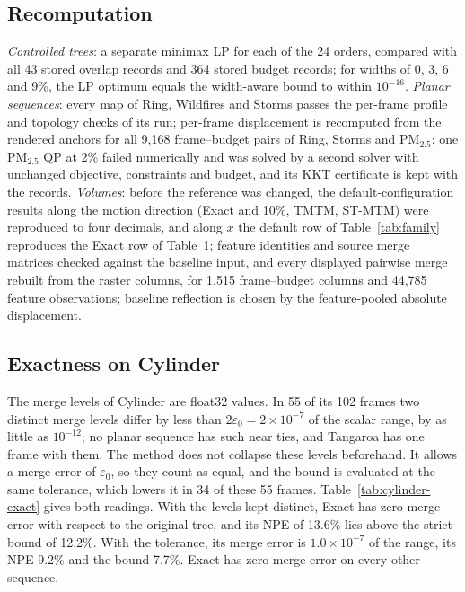 \documentclass[preprint]{vgtc}
\begin{document}
\subsection{Recomputation}\label{sec:recompute}
\emph{Controlled trees}: a separate minimax LP for each of the 24 orders, compared with all 43 stored overlap records and 364 stored budget records; for widths of 0, 3, 6 and 9\%, the LP optimum equals the width-aware bound to within $10^{-16}$. \emph{Planar sequences}: every map of Ring, Wildfires and Storms passes the per-frame profile and topology checks of its run; per-frame displacement is recomputed from the rendered anchors for all 9,168 frame--budget pairs of Ring, Storms and PM$_{2.5}$; one PM$_{2.5}$ QP at 2\% failed numerically and was solved by a second solver with unchanged objective, constraints and budget, and its KKT certificate is kept with the records. \emph{Volumes}: before the reference was changed, the default-configuration results along the motion direction (Exact and 10\%, TMTM, ST-MTM) were reproduced to four decimals, and along $x$ the default row of Table~\ref{tab:family} reproduces the Exact row of Table~1; feature identities and source merge matrices checked against the baseline input, and every displayed pairwise merge rebuilt from the raster columns, for 1,515 frame--budget columns and 44,785 feature observations; baseline reflection is chosen by the feature-pooled absolute displacement.

\subsection{Exactness on Cylinder}\label{sec:cylinder-exact}

The merge levels of Cylinder are float32 values. In 55 of its 102 frames two distinct merge levels differ by less than $2\varepsilon_0=2\times10^{-7}$ of the scalar range, by as little as $10^{-12}$; no planar sequence has such near ties, and Tangaroa has one frame with them. The method does not collapse these levels beforehand. It allows a merge error of $\varepsilon_0$, so they count as equal, and the bound is evaluated at the same tolerance, which lowers it in 34 of these 55 frames. Table~\ref{tab:cylinder-exact} gives both readings. With the levels kept distinct, Exact has zero merge error with respect to the original tree, and its NPE of 13.6\% lies above the strict bound of 12.2\%. With the tolerance, its merge error is $1.0\times10^{-7}$ of the range, its NPE 9.2\% and the bound 7.7\%. Exact has zero merge error on every other sequence.
\end{document}
